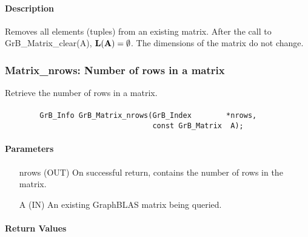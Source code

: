 \paragraph{Description}

Removes all elements (tuples) from an existing matrix. After the call to
{\sf GrB\_Matrix\_clear(A)},
$\mathbf{L}({\bf A}) = \emptyset$. The dimensions of the matrix do not change.


\subsubsection{{\sf Matrix\_nrows}: Number of rows in a matrix}

Retrieve the number of rows in a matrix.

\paragraph{\syntax}

\begin{verbatim}
        GrB_Info GrB_Matrix_nrows(GrB_Index        *nrows,
                                  const GrB_Matrix  A);
\end{verbatim}

\paragraph{Parameters}

\begin{itemize}[leftmargin=1.1in]
    \item[{\sf nrows}] ({\sf OUT}) On successful return, contains the number of rows in the matrix.
    \item[{\sf A}] ({\sf IN}) An existing GraphBLAS matrix being queried.
\end{itemize}


\paragraph{Return Values}

